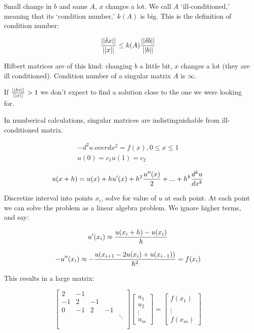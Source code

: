 \documentclass[12pt]{article}
\newcommand{\norm}[1]{\left|\left|#1\right|\right|}
\newcommand{\<}{\langle}
\renewcommand{\>}{\rangle}
\begin{document}
Small change in $b$ and same $A$, $x$ changes a lot. We call $A$ `ill-conditioned,' meaning that its `condition number,' $k(A)$ is big. This is the definition of condition number:

\[
	{\norm{\delta x} \over \norm{x}} \leq k(A) {\norm{\delta b} \over \norm{b}}
\]

Hilbert matrices are of this kind: changing $b$ a little bit, $x$ changes a lot (they are ill conditioned). Condition number of a singular matrix $A$ is $\infty$.

If ${\norm{\delta x} \over \norm{x}} > 1$ we don't expect to find a solution close to the one we were looking for.

In numberical calculations, singular matrices are indistinguishable from ill-conditioned matrix.


\[
	\begin{matrix}
		-{d^2 u \ over dx^2} = f(x), 0 \leq x \leq 1 \\
		u(0) = c_1
		u(1) = c_2
	\end{matrix}
\]

\[
	u(x+h) = u(x) + h u'(x) + h^2 {u''(x) \over 2} + ... + h^k {d^k u \over d x^k}
\]

Discretize interval into points $x_i$, solve for value of $u$ at each point. At each point we can solve the problem as a linear algebra problem. We ignore higher terms, and say:

\[
	u'(x_i) \approx {u(x_i+h) - u(x_i) \over h}
\]

\[
	-u''(x_i) \approx -{u(x_{i+1} - 2 u(x_i) + u(x_{i-1})) \over h^2 } = f(x_i)
\]

This results in a large matrix:

\[
	\begin{bmatrix}
		2 & -1 \\
		-1 & 2 & -1 \\
		0 & -1 & 2 & -1 \\
		 & & & & \ddots \\ \\ \\
	\end{bmatrix}
	\begin{bmatrix}
		u_1 \\ u_2 \\ \vdots \\ u_m
	\end{bmatrix}
	=
	\begin{bmatrix}
		f(x_1) \\ \\ \vdots \\ f(x_m)
	\end{bmatrix}
\]
\end{document}
